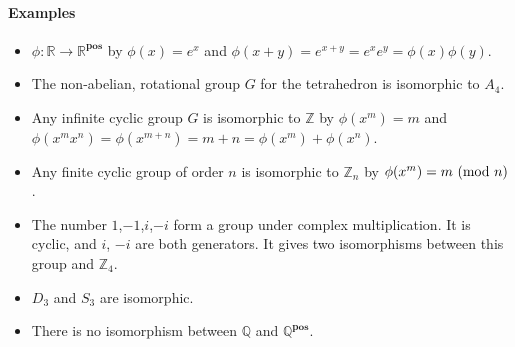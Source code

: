 \documentclass[a4paper,twocolumn,10pt]{article}
\begin{document}
  \paragraph{Examples}
  \begin{itemize}
    \item $\phi\colon \mathbb{R} \rightarrow \mathbb{R}^{\textbf{pos}}$ by
      $\phi{(x)} = e^x$ and $\phi{(x+y)}=e^{x+y}=e^xe^y=\phi{(x)}\phi{(y)}$.
    \item The non-abelian, rotational group $G$ for the tetrahedron is isomorphic to $A_4$.
    \item Any infinite cyclic group $G$ is isomorphic to $\mathbb{Z}$ by
      $\phi{(x^m)} = m$ and $\phi{(x^mx^n)} =
      \phi{(x^{m+n})}=m+n=\phi{(x^m)}+\phi{(x^n)}$.
    \item Any finite cyclic group of order $n$ is isomorphic to $\mathbb{Z}_n$
      by $\phi{(x^m)} = m\ (\text{mod}\ n)$.
    \item The number $1$,$-1$,$i$,$-i$ form a group under complex
      multiplication. It is cyclic, and $i$, $-i$ are both generators. It gives
      two isomorphisms between this group and $\mathbb{Z}_4$.
    \item $D_3$ and $S_3$ are isomorphic.
    \item There is no isomorphism between $\mathbb{Q}$ and
      $\mathbb{Q}^{\textbf{pos}}$.
  \end{itemize}
\end{document}
